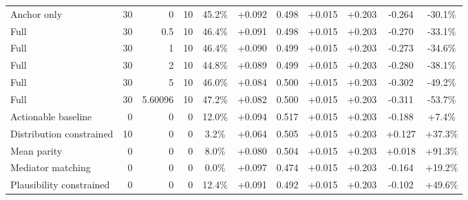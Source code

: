 \begin{table}[htbp]
\begin{tabular}{lrrrccccccc}
Anchor only & 30 & 0 & 10 & 45.2\% & +0.092 & 0.498 & +0.015 & +0.203 & -0.264 & -30.1\% \\
Full & 30 & 0.5 & 10 & 46.4\% & +0.091 & 0.498 & +0.015 & +0.203 & -0.270 & -33.1\% \\
Full & 30 & 1 & 10 & 46.4\% & +0.090 & 0.499 & +0.015 & +0.203 & -0.273 & -34.6\% \\
Full & 30 & 2 & 10 & 44.8\% & +0.089 & 0.499 & +0.015 & +0.203 & -0.280 & -38.1\% \\
Full & 30 & 5 & 10 & 46.0\% & +0.084 & 0.500 & +0.015 & +0.203 & -0.302 & -49.2\% \\
Full & 30 & 5.60096 & 10 & 47.2\% & +0.082 & 0.500 & +0.015 & +0.203 & -0.311 & -53.7\% \\
Actionable baseline & 0 & 0 & 0 & 12.0\% & +0.094 & 0.517 & +0.015 & +0.203 & -0.188 & +7.4\% \\
Distribution constrained & 10 & 0 & 0 & 3.2\% & +0.064 & 0.505 & +0.015 & +0.203 & +0.127 & +37.3\% \\
Mean parity & 0 & 0 & 0 & 8.0\% & +0.080 & 0.504 & +0.015 & +0.203 & +0.018 & +91.3\% \\
Mediator matching & 0 & 0 & 0 & 0.0\% & +0.097 & 0.474 & +0.015 & +0.203 & -0.164 & +19.2\% \\
Plausibility constrained & 0 & 0 & 0 & 12.4\% & +0.091 & 0.492 & +0.015 & +0.203 & -0.102 & +49.6\% \\
\bottomrule
\end{tabular}
\end{table}
